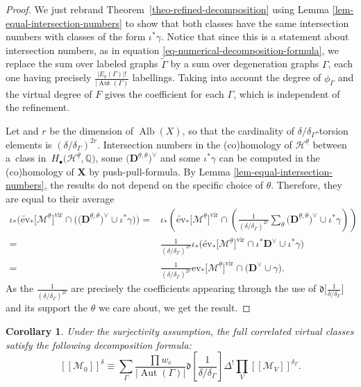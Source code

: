 \documentclass[pdftex]{sigma}
\newcommand{\vir}[1]{\big[#1\big]^\mathrm{vir}}
\newcommand{\fvir}[2]{[\![ #1 ]\!]^{#2}}
\newcommand{\ev}{\mathrm{ev}}
\renewcommand{\d}[1]{\dfk\left[ #1 \right]}
\newcommand{\Alb}{\operatorname{Alb}}
\newcommand{\QQ}{\mathbb{Q}}
\newcommand{\btheta}{ {\underline{\theta}} }
\newcommand{\bfX}{ {\boldsymbol X} }
\newcommand{\bfD}{ {\boldsymbol D} }
\newcommand{\dfk}{\mathfrak{d}}
\newcommand{\M}{\mathcal{M}}
\renewcommand{\H}{\mathcal{H}}
\numberwithin{equation}{section}
\newtheorem{coro}[theo]{Corollary}
\theoremstyle{definition}
\begin{document}
\begin{proof}
 We just rebrand Theorem~\ref{theo-refined-decomposition} using Lemma \ref{lem-equal-intersection-numbers} to show that both classes have the same intersection numbers with classes of the form $\iota^*\gamma$. Notice that since this is a statement about intersection numbers, as in equation \eqref{eq-numerical-decomposition-formula}, we replace the sum over labeled graphs $\widetilde{\Gamma}$ by a sum over degeneration graphs $\Gamma$, each one having precisely $\frac{|E_b(\Gamma)|!}{|\operatorname{Aut}(\Gamma)}$ labellings. Taking into account the degree of $\phi_\Gamma$ and the virtual degree of $F$ gives the coefficient for each $\Gamma$, which is independent of the refinement.

 Let \smash{$\vir{\boldsymbol{\M}^\btheta}=\prod\vir{\M_V^{\theta_V}}$} and $r$ be the dimension of $\Alb(X)$, so that the cardinality of $\delta/\delta_\Gamma$-torsion elements is $(\delta/\delta_\Gamma)^{2r}$. Intersection numbers in the (co)homology of $\boldsymbol{\H}^\btheta$ between a~class in~$H_\bullet\bigl(\boldsymbol{\H}^\btheta,\QQ\bigr)$, some $\bigl(\bfD^{\btheta,\theta}\bigr)^{\vee}$ and some $\iota^*\gamma$ can be computed in the (co)homology of $\bfX$ by push-pull-formula. By Lemma \ref{lem-equal-intersection-numbers}, the results do not depend on the specific choice of $\theta$. Therefore, they are equal to their average
 \begin{align*}
 \iota_*\bigl(\widetilde{\ev}_*\vir{\boldsymbol{\M}^\btheta}\cap \bigl(\bigl(\bfD^{\btheta,\theta}\bigr)^{\vee}\cup\iota^*\gamma\bigr) \bigr) ={} & \iota_*\left( \widetilde{\ev}_*\vir{\boldsymbol{\M}^\btheta}\cap \left(\frac{1}{(\delta/\delta_\Gamma)^{2r}}\sum_{\theta}\bigl(\bfD^{\btheta,\theta}\bigr)^{\vee}\cup\iota^*\gamma\right) \right) \\
 ={} & \frac{1}{(\delta/\delta_\Gamma)^{2r}} \iota_*\bigl(\widetilde{\ev}_*\vir{\boldsymbol{\M}^\btheta}\cap \iota^*\bfD^\vee\cup\iota^*\gamma \bigr) \\
 = {}& \frac{1}{(\delta/\delta_\Gamma)^{2r}} \ev_*\vir{\boldsymbol{\M}^\btheta}\cap\bigl(\bfD^\vee\cup\gamma\bigr).
 \end{align*}
 As the $\frac{1}{(\delta/\delta_\Gamma)^{2r}}$ are precisely the coefficients appearing through the use of $\dfk\big[\frac{1}{\delta/\delta_\Gamma}\big]$ and its support the $\theta$ we care about, we get the result.
\end{proof}

\begin{coro}
Under the surjectivity assumption, the full correlated virtual classes satisfy the following decomposition formula:
\[ \fvir{\M_0}{\delta}
\equiv \sum_\Gamma \frac{\prod w_e}{|\operatorname{Aut}(\Gamma)|}\d{\frac{1}{\delta/\delta_\Gamma}}\Delta^!\prod_V \fvir{\M_V}{\delta_\Gamma}. \]
\end{coro}
\end{document}
